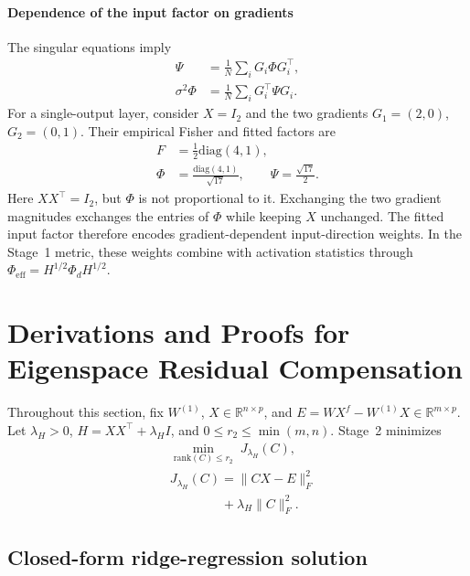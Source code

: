\paragraph{Dependence of the input factor on gradients}
The singular equations imply
\begin{equation}
\begin{aligned}
\Psi&=\frac1N\sum_iG_i\Phi G_i^\top,\\
\sigma^2\Phi&=\frac1N\sum_iG_i^\top\Psi G_i.
\end{aligned}
\end{equation}
For a single-output layer, consider $X=I_2$ and the two gradients $G_1=(2,0)$, $G_2=(0,1)$. Their empirical Fisher and fitted factors are
\begin{equation}
\begin{aligned}
F&=\tfrac12\mathrm{diag}(4,1),\\
\Phi&=\frac{\mathrm{diag}(4,1)}{\sqrt{17}},\qquad
\Psi=\frac{\sqrt{17}}2.
\end{aligned}
\end{equation}
Here $XX^\top=I_2$, but $\Phi$ is not proportional to it. Exchanging the two gradient magnitudes exchanges the entries of $\Phi$ while keeping $X$ unchanged. The fitted input factor therefore encodes gradient-dependent input-direction weights. In the Stage~1 metric, these weights combine with activation statistics through $\Phi_{\mathrm{eff}}=H^{1/2}\Phi_dH^{1/2}$.

\section{Derivations and Proofs for Eigenspace Residual Compensation}\label{sup:lemma-corollary}

Throughout this section, fix $W^{(1)}$, $X\in\mathbb R^{n\times p}$, and $E=WX^f-W^{(1)}X\in\mathbb R^{m\times p}$. Let $\lambda_H>0$, $H=XX^\top+\lambda_H I$, and $0\le r_2\le\min(m,n)$. Stage~2 minimizes
\begin{equation}
\begin{aligned}
&\min_{\mathrm{rank}(C)\le r_2}\;J_{\lambda_H}(C),\\
&J_{\lambda_H}(C)=\|CX-E\|_F^2 \\
&\qquad\qquad+\lambda_H\|C\|_F^2.
\end{aligned}
\label{eq:sup-ridge-objective}
\end{equation}

\subsection{Closed-form ridge-regression solution}\label{sup:ridge-derivation}

